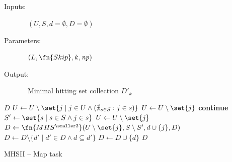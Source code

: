 \begin{algorithm*}
  \begin{description}
  \item[Inputs:]\ $(U, S, d=\emptyset, D=\emptyset)$
  \item[\ColorLine Parameters:]\ $(L,\fn{Skip}, k, \nproc)$
  \item[Output:]\ Minimal hitting set collection $D'_k$
  \end{description}

  \begin{algorithmic}[1]
     \label{alg:mhs2p:map:opt3}
    \State \Return $D$
    \EndIf
     \label{alg:mhs2p:map:divide}
    \State $U \gets U \setminus \set{j \mid j \in U \wedge (\nexists_{s \in S}: j\in s)}$ \label{alg:mhs2p:map:opt2}
     \label{alg:mhs2p:map:rank}
     \label{alg:mhs2p:map:skip}
    \CSTATE $U \gets U \setminus \set{j}$    \label{alg:mhs2p:map:opt1.1}
    \CSTATE \textbf{continue}
    \EndIf
    \State $S' \gets \set{s \mid s \in S \wedge j \in s}$ \label{alg:mhs2p:map:S'}
    \State $U \gets U \setminus \set{j}$  \label{alg:mhs2p:map:opt1.2}
    \State $D \gets \fn{MHS^\text{\smaller2}}(U  \setminus \set{j}, S \setminus S', d \cup \{j\}, D)$
    \EndFor
    \Else
     \label{alg:mhs2p:map:isminimal}
    \State $D \gets D \setminus \{d' \mid d' \in D \wedge  d \subseteq d'\}$ \label{alg:mhs2p:map:purge}
    \State $D \gets D \cup \{d\}$ \label{alg:mhs2p:map:addD}
    \EndIf
    \EndIf
    \State \Return $D$
  \end{algorithmic}
  \caption{\acs{MHSII} -- Map task\label{alg:mhs2p:map}}
\end{algorithm*}

